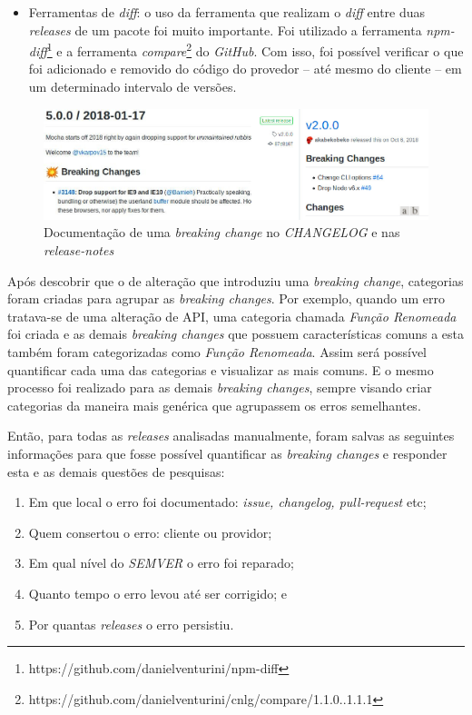 \begin{itemize}
    \item Ferramentas de \textit{diff}: o uso da ferramenta que realizam o  \textit{diff} entre duas \textit{releases} de um pacote foi muito importante. Foi utilizado a ferramenta \textit{npm-diff}\footnote{https://github.com/danielventurini/npm-diff} e a ferramenta \textit{compare}\footnote{https://github.com/danielventurini/cnlg/compare/1.1.0..1.1.1} do \textit{GitHub}. Com isso, foi possível verificar o que foi adicionado e removido do código do provedor -- até mesmo do cliente -- em um determinado intervalo de versões.
\end{itemize}

\begin{figure}
    \centering
    \includegraphics[scale=0.45]{figuras/bc_documentation.jpeg}
    \caption{Documentação de uma \textit{breaking change} no \textit{CHANGELOG} e nas \textit{release-notes}}
    \label{fig:bc_documentation}
\end{figure}{}

Após descobrir que o de alteração que introduziu uma \textit{breaking change}, categorias foram criadas para agrupar as \textit{breaking changes}. Por exemplo, quando um erro tratava-se de uma alteração de \gls{API}, uma categoria chamada \textit{Função Renomeada} foi criada e as demais \textit{breaking changes} que possuem características comuns a esta também foram categorizadas como \textit{Função Renomeada}. Assim será possível quantificar cada uma das categorias e visualizar as mais comuns. E o mesmo processo foi realizado para as demais \textit{breaking changes}, sempre visando criar categorias da maneira mais genérica que agrupassem os erros semelhantes.

Então, para todas as \textit{releases} analisadas manualmente, foram salvas as seguintes informações para que fosse possível quantificar as \textit{breaking changes} e responder esta e as demais questões de pesquisas:

\begin{enumerate}
    \item Em que local o erro foi documentado: \textit{issue, changelog, pull-request} etc;
    \item Quem consertou o erro: cliente ou providor;
    \item Em qual nível do \textit{SEMVER} o erro foi reparado;
    \item Quanto tempo o erro levou até ser corrigido; e
    \item Por quantas \textit{releases} o erro persistiu.
\end{enumerate}{}


